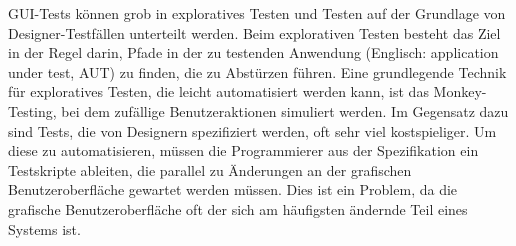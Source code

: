 GUI-Tests können grob in exploratives Testen und Testen auf der Grundlage von Designer-Testfällen unterteilt werden.
Beim explorativen Testen besteht das Ziel in der Regel darin, Pfade in der zu testenden Anwendung (Englisch: application under test, AUT) zu finden, die zu Abstürzen führen.
Eine grundlegende Technik für exploratives Testen, die leicht automatisiert werden kann, ist das Monkey-Testing, bei dem zufällige Benutzeraktionen simuliert werden.
Im Gegensatz dazu sind Tests, die von Designern spezifiziert werden, oft sehr viel kostspieliger.
Um diese zu automatisieren, müssen die Programmierer aus der Spezifikation ein Testskripte ableiten, die parallel zu Änderungen an der grafischen Benutzeroberfläche gewartet werden müssen.
Dies ist ein Problem, da die grafische Benutzeroberfläche oft der sich am häufigsten ändernde Teil eines Systems ist.


